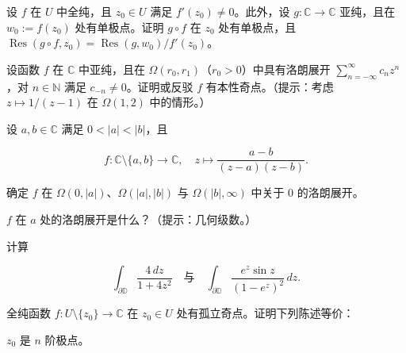 \exerciseshead

\begin{exercises}
\item

设 $ f $ 在 $ U $ 中全纯，且 $ z_{0} \in U $ 满足 $ f'(z_{0}) \ne 0 $。此外，设 $ g : \mathbb{C} \to \mathbb{C} $ 亚纯，且在 $ w_{0} := f(z_{0}) $ 处有单极点。证明 $ g \circ f $ 在 $ z_{0} $ 处有单极点，且 $ \operatorname{Res}(g \circ f, z_{0}) = \operatorname{Res}(g, w_{0})/f'(z_{0}) $。

\item

设函数 $ f $ 在 $ \mathbb{C} $ 中亚纯，且在 $ \Omega(r_{0}, r_{1}) $（$ r_{0} > 0 $）中具有洛朗展开 $ \sum_{n=-\infty}^{\infty}c_{n}z^{n} $，对 $ n \in \mathbb{N} $ 满足 $ c_{-n} \ne 0 $。证明或反驳 $ f $ 有本性奇点。（提示：考虑 $ z \mapsto 1/(z - 1) $ 在 $ \Omega(1, 2) $ 中的情形。）

\item

设 $ a, b \in \mathbb{C} $ 满足 $ 0 < \left|a\right| < \left|b\right| $，且

\[
f : \mathbb{C}\setminus\{a,b\} \to \mathbb{C} , \quad z \mapsto \frac{a - b}{(z - a)(z - b)} .
\]

\begin{items}
\item

确定 $ f $ 在 $ \Omega(0,\left|a\right|) $、$ \Omega(\left|a\right|,\left|b\right|) $ 与 $ \Omega(\left|b\right|,\infty) $ 中关于 $ 0 $ 的洛朗展开。

\item

$ f $ 在 $ a $ 处的洛朗展开是什么？（提示：几何级数。）

\end{items}

\item

计算

\[
\int_{\partial\mathbb{D}}\frac{4\,dz}{1 + 4z^{2}} \quad \text{与} \quad \int_{\partial\mathbb{D}}\frac{e^{z}\sin z}{(1 - e^{z})^{2}}\,dz .
\]
\item

全纯函数 $ f : U\setminus\{z_{0}\} \to \mathbb{C} $ 在 $ z_{0} \in U $ 处有孤立奇点。证明下列陈述等价：

\begin{subitems}
\item

$ z_{0} $ 是 $ n $ 阶极点。


\end{subitems}
\end{exercises}
